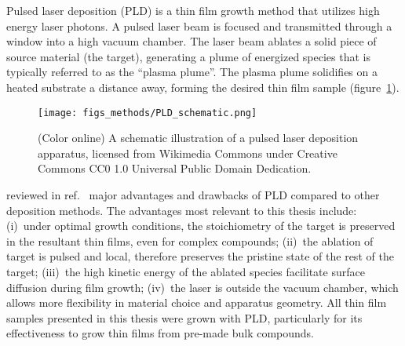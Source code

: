 Pulsed laser deposition (PLD) is a thin film growth method that utilizes high energy laser photons. A pulsed laser beam is focused and transmitted through a window into a high vacuum chamber. The laser beam ablates a solid piece of source material (the target), generating a plume of energized species that is typically referred to as the ``plasma plume''. The plasma plume solidifies on a heated substrate a distance away, forming the desired thin film sample (figure~\ref{fig:PLD_schematic}). %
\begin{figure}[ht]%
	\centering%
    \texttt{[image: figs\_methods/PLD\_schematic.png]}%
    \caption[Schematic Illustration of a PLD apparatus]{\label{fig:PLD_schematic}(Color online) A schematic illustration of a pulsed laser deposition apparatus, licensed from Wikimedia Commons under Creative Commons CC0 1.0 Universal Public Domain Dedication.}%
\end{figure}%
%
\citeauthor{PLD_review} reviewed in ref.~\cite{PLD_review} major advantages and drawbacks of PLD compared to other deposition methods. The advantages most relevant to this thesis include: (i)~under optimal growth conditions, the stoichiometry of the target is preserved in the resultant thin films, even for complex compounds; (ii)~the ablation of target is pulsed and local, therefore preserves the pristine state of the rest of the target; (iii)~the high kinetic energy of the ablated species facilitate surface diffusion during film growth; (iv)~the laser is outside the vacuum chamber, which allows more flexibility in material choice and apparatus geometry. All thin film samples presented in this thesis were grown with PLD, particularly for its effectiveness to grow thin films from pre-made bulk compounds.


